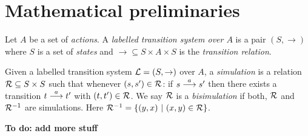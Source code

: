 \section{Mathematical preliminaries}\label{preliminaries}

\begin{definition}
Let $A$ be a set of \emph{actions}.  A \emph{labelled transition
  system over $A$} is a pair $(S, \rightarrow)$ where $S$ is a set of
\emph{states} and $\rightarrow \subseteq S \times A \times S$ is the
\emph{transition relation}.
\end{definition}

\begin{definition}
Given a labelled transition system $\mathcal{L} = (S, \rightarrow)$ over $A$,
a \emph{simulation} is a relation $\mathcal{R} \subseteq S \times S$ such
that whenever $(s, s') \in \mathcal{R}$: if $s \stackrel{a}{\longrightarrow} s'$ then there
exists a transition $t \stackrel{a}{\longrightarrow} t'$ with $(t, t') \in \mathcal{R}$.  We say
$\mathcal{R}$ is a \emph{bisimulation} if both, $\mathcal{R}$ and $\mathcal{R}^{-1}$ are
simulations. Here $\mathcal{R}^{-1} = \{(y, x)\ |\ (x, y) \in \mathcal{R}\}$.
\end{definition}


\NI \textbf{To do: add more stuff}
